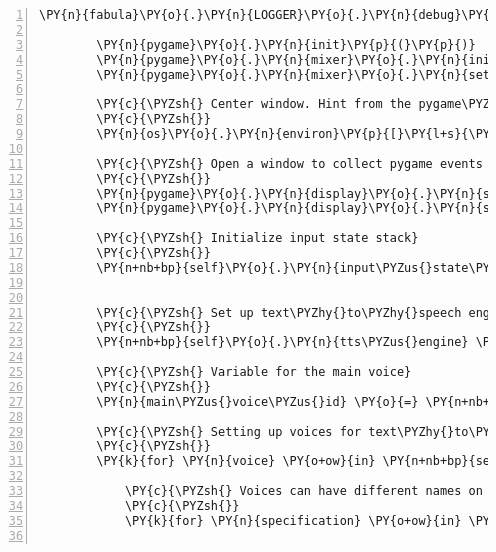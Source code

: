 \begin{Verbatim}[commandchars=\\\{\},numbers=left,firstnumber=1,stepnumber=1]
        \PY{n}{fabula}\PY{o}{.}\PY{n}{LOGGER}\PY{o}{.}\PY{n}{debug}\PY{p}{(}\PY{l+s}{\PYZdq{}}\PY{l+s}{initializing pygame}\PY{l+s}{\PYZdq{}}\PY{p}{)}

        \PY{n}{pygame}\PY{o}{.}\PY{n}{init}\PY{p}{(}\PY{p}{)}
        \PY{n}{pygame}\PY{o}{.}\PY{n}{mixer}\PY{o}{.}\PY{n}{init}\PY{p}{(}\PY{p}{)}
        \PY{n}{pygame}\PY{o}{.}\PY{n}{mixer}\PY{o}{.}\PY{n}{set\PYZus{}num\PYZus{}channels}\PY{p}{(}\PY{l+m+mi}{11}\PY{p}{)}

        \PY{c}{\PYZsh{} Center window. Hint from the pygame\PYZhy{}users mailing list.}
        \PY{c}{\PYZsh{}}
        \PY{n}{os}\PY{o}{.}\PY{n}{environ}\PY{p}{[}\PY{l+s}{\PYZsq{}}\PY{l+s}{SDL\PYZus{}VIDEO\PYZus{}CENTERED}\PY{l+s}{\PYZsq{}}\PY{p}{]} \PY{o}{=} \PY{l+s}{\PYZsq{}}\PY{l+s}{1}\PY{l+s}{\PYZsq{}}

        \PY{c}{\PYZsh{} Open a window to collect pygame events and add a caption.}
        \PY{c}{\PYZsh{}}
        \PY{n}{pygame}\PY{o}{.}\PY{n}{display}\PY{o}{.}\PY{n}{set\PYZus{}mode}\PY{p}{(}\PY{n}{SCREENSIZE}\PY{p}{)}
        \PY{n}{pygame}\PY{o}{.}\PY{n}{display}\PY{o}{.}\PY{n}{set\PYZus{}caption}\PY{p}{(}\PY{l+s}{\PYZdq{}}\PY{l+s}{fabula audio client}\PY{l+s}{\PYZdq{}}\PY{p}{)}

        \PY{c}{\PYZsh{} Initialize input state stack}
        \PY{c}{\PYZsh{}}
        \PY{n+nb+bp}{self}\PY{o}{.}\PY{n}{input\PYZus{}state\PYZus{}stack} \PY{o}{=} \PY{p}{[}\PY{p}{]}


        \PY{c}{\PYZsh{} Set up text\PYZhy{}to\PYZhy{}speech engine}
        \PY{c}{\PYZsh{}}
        \PY{n+nb+bp}{self}\PY{o}{.}\PY{n}{tts\PYZus{}engine} \PY{o}{=} \PY{n}{pyttsx}\PY{o}{.}\PY{n}{init}\PY{p}{(}\PY{p}{)}

        \PY{c}{\PYZsh{} Variable for the main voice}
        \PY{c}{\PYZsh{}}
        \PY{n}{main\PYZus{}voice\PYZus{}id} \PY{o}{=} \PY{n+nb+bp}{None}

        \PY{c}{\PYZsh{} Setting up voices for text\PYZhy{}to\PYZhy{}speech engine}
        \PY{c}{\PYZsh{}}
        \PY{k}{for} \PY{n}{voice} \PY{o+ow}{in} \PY{n+nb+bp}{self}\PY{o}{.}\PY{n}{tts\PYZus{}engine}\PY{o}{.}\PY{n}{getProperty}\PY{p}{(}\PY{l+s}{\PYZsq{}}\PY{l+s}{voices}\PY{l+s}{\PYZsq{}}\PY{p}{)}\PY{p}{:}

            \PY{c}{\PYZsh{} Voices can have different names on different platforms}
            \PY{c}{\PYZsh{}}
            \PY{k}{for} \PY{n}{specification} \PY{o+ow}{in} \PY{n+nb+bp}{self}\PY{o}{.}\PY{n}{VOICE\PYZus{}SPECIFICATIONS}\PY{p}{:}


\end{Verbatim}
